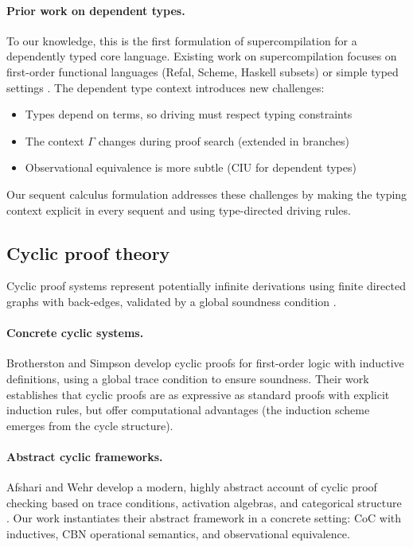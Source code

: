 \paragraph{Prior work on dependent types.}
To our knowledge, this is the first formulation of supercompilation for a dependently typed core language.
Existing work on supercompilation focuses on first-order functional languages (Refal, Scheme, Haskell subsets) or simple typed settings \cite{sorensen-gluck-1995-supercompilation,jonesbook-1996-partial-evaluation}.
The dependent type context introduces new challenges:
\begin{itemize}
\item Types depend on terms, so driving must respect typing constraints
\item The context $\Gamma$ changes during proof search (extended in branches)
\item Observational equivalence is more subtle (CIU for dependent types)
\end{itemize}

Our sequent calculus formulation addresses these challenges by making the typing context explicit in every sequent and using type-directed driving rules.

\subsection{Cyclic proof theory}

Cyclic proof systems represent potentially infinite derivations using finite directed graphs with back-edges, validated by a global soundness condition \cite{brotherston-2006-cyclic,brotherston-simpson-2011-sequent}.

\paragraph{Concrete cyclic systems.}
Brotherston and Simpson develop cyclic proofs for first-order logic with inductive definitions, using a global trace condition to ensure soundness.
Their work establishes that cyclic proofs are as expressive as standard proofs with explicit induction rules, but offer computational advantages (the induction scheme emerges from the cycle structure).

\paragraph{Abstract cyclic frameworks.}
Afshari and Wehr develop a modern, highly abstract account of cyclic proof checking based on trace conditions, activation algebras, and categorical structure \cite{afshari-wehr-2024-abstract-cyclic}.
Our work instantiates their abstract framework in a concrete setting: CoC with inductives, CBN operational semantics, and observational equivalence.

